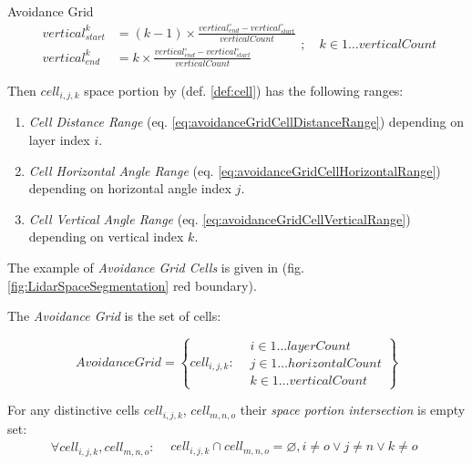 \begin{definition}{Avoidance Grid}
\begin{equation}\label{eq:avoidanceGridCellVerticalRange}
    \begin{aligned}
        vertical^k_{start} & = (k-1)\times\frac{vertical^\circ_{end}-vertical^\circ_{start}}{vertical Count}\\
        vertical^k_{end} & = k\times\frac{vertical^\circ_{end}-vertical^\circ_{start}}{vertical Count}
    \end{aligned};\quad k\in 1\dots vertical Count
\end{equation}


\noindent Then $cell_{i,j,k}$ space portion by (def. \ref{def:cell}) has the following ranges:
\begin{enumerate}
    \item \emph{Cell Distance Range} (eq. \ref{eq:avoidanceGridCellDistanceRange}) depending on layer index $i$.
    
    \item \emph{Cell Horizontal Angle Range} (eq. \ref{eq:avoidanceGridCellHorizontalRange}) depending on horizontal angle index $j$.
    
    \item \emph{Cell Vertical Angle Range} (eq. \ref{eq:avoidanceGridCellVerticalRange}) depending on vertical index $k$.
\end{enumerate}

\begin{note}
	The example of \emph{Avoidance Grid Cells} is given in (fig. \ref{fig:LidarSpaceSegmentation} red boundary).
\end{note} 

The \emph{Avoidance Grid} is the set of cells:

\begin{equation}\label{eq:avoidanceGridCellSpace}
    Avoidance Grid = \left\{
    					cell_{i,j,k}:
    					\begin{aligned}
    						& i \in 1 \dots layer Count\\
    						& j \in 1 \dots horizontal Count\\
    						& k \in 1 \dots vertical Count
    					\end{aligned} 
                     \right\}
\end{equation}

\begin{note}
	For any distinctive cells $cell_{i,j,k}$, $cell_{m,n,o}$ their \emph{space portion intersection} is empty set:
	\begin{equation}
		\forall cell_{i,j,k}, cell_{m,n,o}:
		\begin{aligned}
		    &cell_{i,j,k}\cap cell_{m,n,o} = \varnothing,
		    i \neq o \lor j \neq n \lor k \neq o
		\end{aligned}
	\end{equation}
\end{note}
\end{definition}

